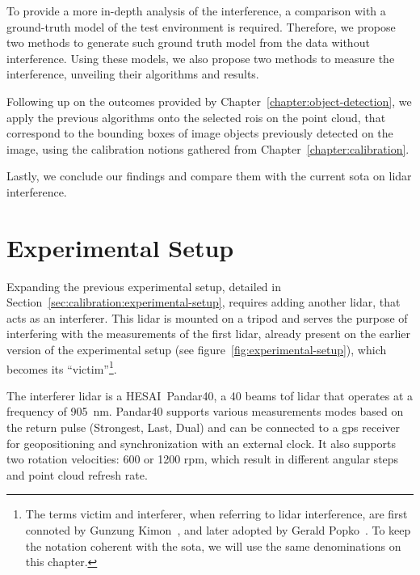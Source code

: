 To provide a more in-depth analysis of the interference, a comparison with a ground-truth model of the test environment is required. Therefore, we propose two methods to generate such ground truth model from the data without interference. Using these models, we also propose two methods to measure the interference, unveiling their algorithms and results.

Following up on the outcomes provided by Chapter~\ref{chapter:object-detection}, we apply the previous algorithms onto the selected \acp{roi} on the point cloud, that correspond to the bounding boxes of image objects previously detected on the image, using the calibration notions gathered from Chapter~\ref{chapter:calibration}.

Lastly, we conclude our findings and compare them with the current \acl{sota} on \ac{lidar} interference.



\section{Experimental Setup}
\label{sec:lidar-interference:experimental-setup}

Expanding the previous experimental setup, detailed in Section~\ref{sec:calibration:experimental-setup}, requires adding another \ac{lidar}, that acts as an interferer. This \ac{lidar} is mounted on a tripod and serves the purpose of interfering with the measurements of the first \ac{lidar}, already present on the earlier version of the experimental setup (see figure~\ref{fig:experimental-setup}), which becomes its ``victim''\footnote{The terms victim and interferer, when referring to \ac{lidar} interference, are first connoted by Gunzung Kim\etal on~\cite{Kim2015a, Kim2015b, Kim2015c, Kim2017}, and later adopted by Gerald Popko\etal~\cite{Popko2019a, Popko2019b}. To keep the notation coherent with the \acl{sota}, we will use the same denominations on this chapter.}.

The interferer \ac{lidar} is a HESAI\cp~Pandar40\texttrademark, a 40 beams \ac{tof} \ac{lidar} that operates at a frequency of \SI{905}{\nano\meter}. Pandar40 supports various measurements modes based on the return pulse (Strongest, Last, Dual) and can be connected to a \ac{gps} receiver for geopositioning and synchronization with an external clock. It also supports two rotation velocities: 600 or 1200 \ac{rpm}, which result in different angular steps and point cloud refresh rate. 

